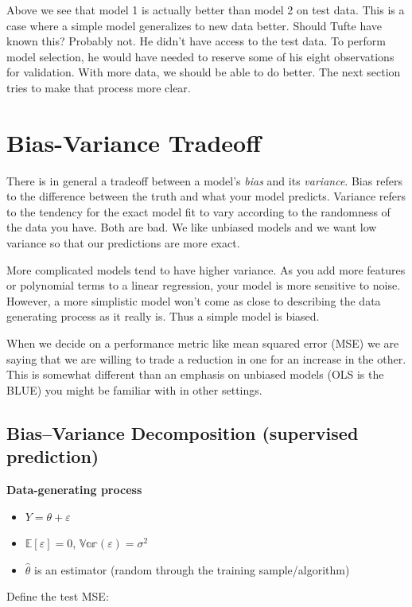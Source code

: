 Above we see that model 1 is actually better than model 2 on test data. This is a case where a simple model generalizes to new data better. Should Tufte have known this? Probably not. He didn't have access to the test data. To perform model selection, he would have needed to reserve some of his eight observations for validation. With more data, we should be able to do better. The next section tries to make that process more clear.

\section{Bias-Variance Tradeoff}

There is in general a tradeoff between a model's \textit{bias} and its \textit{variance}. Bias refers to the difference between the truth and what your model predicts. Variance refers to the tendency for the exact model fit to vary according to the randomness of the data you have. Both are bad. We like unbiased models and we want low variance so that our predictions are more exact.

More complicated models tend to have higher variance. As you add more features or polynomial terms to a linear regression, your model is more sensitive to noise. However, a more simplistic model won't come as close to describing the data generating process as it really is. Thus a simple model is biased.

When we decide on a performance metric like mean squared error (MSE) we are saying that we are willing to trade a reduction in one for an increase in the other. This is somewhat different than an emphasis on unbiased models (OLS is the BLUE) you might be familiar with in other settings.

\subsection{Bias–Variance Decomposition (supervised prediction)}

\textbf{Data-generating process}
\begin{itemize}
\item $Y = \theta + \varepsilon$
\item $\mathbb{E}[\varepsilon] = 0$, $\mathbb{Var}(\varepsilon) = \sigma^2$
\item $\hat \theta$ is an estimator (random through the training sample/algorithm)
\end{itemize}

Define the test MSE:

